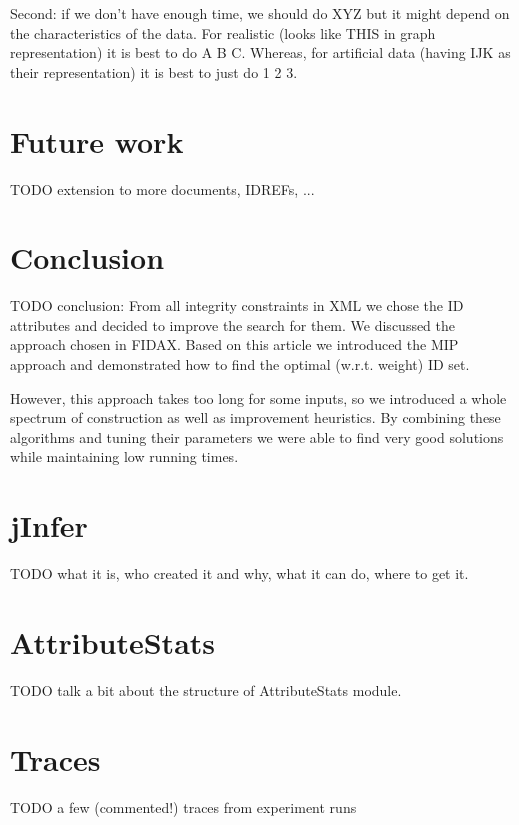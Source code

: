 \documentclass[a4paper,12pt,oneside]{report}
\let\openright=\clearpage
\def\chapwithtoc#1{
\chapter*{#1}
\addcontentsline{toc}{chapter}{#1}
}
\begin{document}
Second: if we don't have enough time, we should do XYZ but it might depend on the characteristics of the data.
For realistic (looks like THIS in graph representation) it is best to do A B C.
Whereas, for artificial data (having IJK as their representation) it is best to just do 1 2 3.

\chapter{Future work}

TODO extension to more documents, IDREFs, ...  

\chapwithtoc{Conclusion}

TODO conclusion: From all integrity constraints in XML we chose the ID attributes and decided to improve the search for them. We discussed the approach chosen in FIDAX. Based on this article we introduced the MIP approach and demonstrated how to find the optimal (w.r.t. weight) ID set.

However, this approach takes too long for some inputs, so we introduced a whole spectrum of construction as well as improvement heuristics. By combining these algorithms and tuning their parameters we were able to find very good solutions while maintaining low running times.

\newpage
\nocite{*}



\listoftables
{}


\printnomenclature[2cm]


\appendix

\openright
{}

\chapter{jInfer}
\label{jInfer}

TODO what it is, who created it and why, what it can do, where to get it.

\chapter{AttributeStats}
\label{attrstats}

TODO talk a bit about the structure of AttributeStats module.

\chapter{Traces}
\label{traces}

TODO a few (commented!) traces from experiment runs
\end{document}
